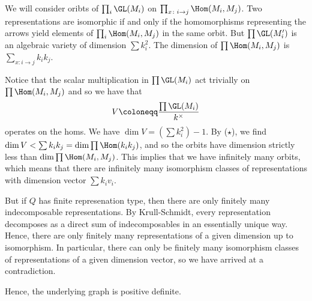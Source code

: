 We will consider oribts of $\prod_i \GL(M_i)$ on $\prod_{x\colon i\to j} \Hom(M_i, M_j)$.
Two representations are isomorphic if and only if the homomorphisms
representing the arrows yield elements of  $\prod_i \Hom(M_i, M_j)$ in the same
orbit. But $\prod \GL(M_i')$ is an algebraic variety of dimension
$\sum k_i^2$. The dimension of $\prod \Hom(M_i, M_j)$ is $\sum_{x\colon i\to j} k_ik_j$.

Notice that the scalar multiplication in $\prod \GL(M_i)$ act trivially
on $\prod \Hom(M_i, M_j)$ and so we have that
\[ V\coloneqq \frac{\prod \GL(M_i)}{k^\times} \]
operates on the homs. We have $\dim V = \left(\sum k_i^2\right) - 1$. By ($\star$),
we find $\dim V < \sum k_ik_j = \dim \prod \Hom(k_ik_j)$, and so the orbits
have dimension strictly less than $\dim \prod\Hom(M_i, M_j)$. This implies
that we have infinitely many orbits, which means that there are infinitely
many isomorphism classes of representations with dimension vector
$\sum k_iv_i$.

But if $Q$ has finite represenation type, then there are only finitely
many indecomposable representations. By Krull-Schmidt, every representation
decomposes as a direct sum of indecomposables in an essentially unique way.
Hence, there are only finitely many representations of a given dimension
up to isomorphism. In particular, there can only be finitely many isomorphism
classes of representations of a given dimension vector, so we have arrived
at a contradiction.

Hence, the underlying graph is positive definite.
